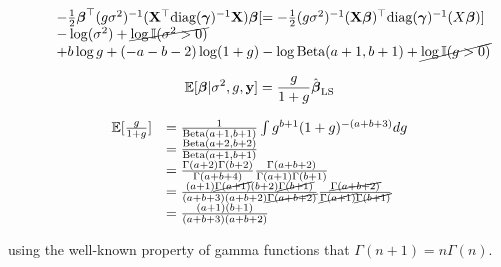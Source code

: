 \documentclass{amsart}[12pt]
\theoremstyle{definition}
\begin{document}
\begin{equation*}
\begin{array}{ll}
		                      & \quad		-\tfrac{1}{2} {\boldsymbol \beta}^\top (g \sigma^2)^{-1} ({\bf X}^\top \text{diag}({\boldsymbol \gamma})^{-1} {\bf X}) {\boldsymbol \beta} [= -\tfrac{1}{2} (g \sigma^2)^{-1} ({\bf X} {\boldsymbol \beta})^\top \text{diag}({\boldsymbol \gamma})^{-1} (X {\boldsymbol \beta})] \\
		                      & \quad - \log(\sigma^2) + \cancel{\log {\mathbb I}(\sigma^2 > 0)}                                                                                                                        \\
		                      & \quad + b \log g + (-a - b - 2) \log(1 + g) - \log \text{Beta}(a + 1,  b + 1) + \cancel{\log {\mathbb I}(g > 0)}                                                                        
	\end{array}
\end{equation*}

\[
	\mathbb{E}[{\boldsymbol \beta} | \sigma^2, g, {\bf y}] = \frac{g}{1 + g} \hat{{\boldsymbol \beta}}_{\text{LS}}
\]

\begin{equation*}
	\begin{array}{rl}
		\mathbb{E}[\frac{g}{1 + g}] & = \frac{1}{\text{Beta}(a +1, b + 1)} \int g^{b+1} (1 + g)^{-(a + b + 3)} dg                                                                                                                                        \\
		                    & = \frac{\text{Beta}(a + 2, b + 2)}{\text{Beta}(a + 1, b + 1)}                                                                                                                                                            \\
		                    & = \frac{\Gamma(a + 2) \Gamma(b + 2)}{\Gamma(a + b + 4)} \frac{\Gamma(a + b + 2)}{\Gamma(a + 1) \Gamma(b + 1)}                                                                                                \\
		                    & =  \frac{(a + 1) \cancel{\Gamma(a + 1)} (b + 2) \cancel{\Gamma(b + 1)}}{(a + b + 3) (a + b + 2) \cancel{\Gamma(a + b + 2)}} \frac{\cancel{\Gamma(a + b + 2)}}{\cancel{\Gamma(a + 1)} \cancel{\Gamma(b + 1)}} \\
		                    & = \frac{(a + 1) (b + 1)}{(a + b + 3) (a + b + 2)}                                                                                                                                                            
	\end{array}
\end{equation*}

using the well-known property of gamma functions that $\Gamma(n + 1) = n \Gamma(n)$.
\end{document}
